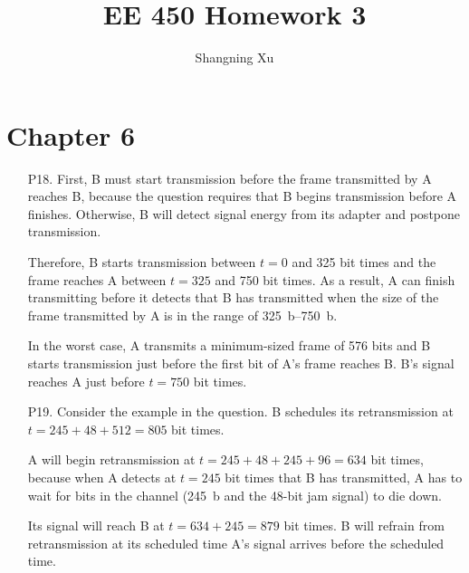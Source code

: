 \documentclass{article}
\title{EE 450 Homework 3}
\author{Shangning Xu}
\begin{document}
\maketitle

\section*{Chapter 6}

\begin{enumerate}
    \item[P18.] First, B must start transmission before the frame transmitted by A reaches B, because the question requires that B begins transmission before A finishes. Otherwise, B will detect signal energy from its adapter and postpone transmission.
    
    Therefore, B starts transmission between $t = 0$ and 325 bit times and the frame reaches A between $t = 325$ and 750 bit times. As a result, A can finish transmitting before it detects that B has transmitted when the size of the frame transmitted by A is in the range of \SIrange{325}{750}{b}.
    
    In the worst case, A transmits a minimum-sized frame of 576 bits and B starts transmission just before the first bit of A's frame reaches B. B's signal reaches A just before $t = 750$ bit times.

    \item[P19.] Consider the example in the question. B schedules its retransmission at $t = 245 + 48 + 512 = 805$ bit times.
    
    A will begin retransmission at $t = 245 + 48 + 245 + 96 = 634$ bit times, because when A detects at $t = 245$ bit times that B has transmitted, A has to wait for bits in the channel (\SI{245}{b} and the 48-bit jam signal) to die down.
    
    Its signal will reach B at $t = 634 + 245 = 879$ bit times. B will refrain from retransmission at its scheduled time A's signal arrives before the scheduled time.
 

\end{enumerate}
\end{document}
